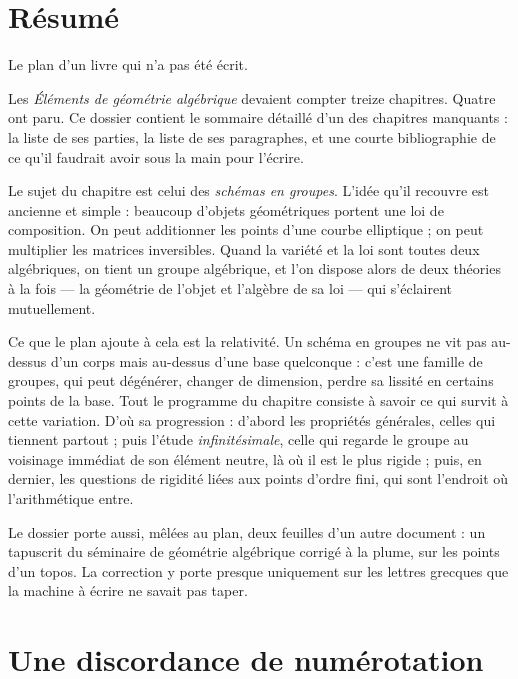 \documentclass[11pt,a4paper]{article}
\begin{document}
\section*{Résumé}

\begin{resume}
Le plan d'un livre qui n'a pas été écrit.

Les \emph{Éléments de géométrie algébrique} devaient compter treize chapitres.
Quatre ont paru. Ce dossier contient le sommaire détaillé d'un des chapitres
manquants : la liste de ses parties, la liste de ses paragraphes, et une courte
bibliographie de ce qu'il faudrait avoir sous la main pour l'écrire.

Le sujet du chapitre est celui des \emph{schémas en groupes}. L'idée qu'il
recouvre est ancienne et simple : beaucoup d'objets géométriques portent une
loi de composition. On peut additionner les points d'une courbe elliptique ;
on peut multiplier les matrices inversibles. Quand la variété et la loi sont
toutes deux algébriques, on tient un groupe algébrique, et l'on dispose alors de
deux théories à la fois --- la géométrie de l'objet et l'algèbre de sa loi ---
qui s'éclairent mutuellement.

Ce que le plan ajoute à cela est la relativité. Un schéma en groupes ne vit pas
au-dessus d'un corps mais au-dessus d'une base quelconque : c'est une famille de
groupes, qui peut dégénérer, changer de dimension, perdre sa lissité en
certains points de la base. Tout le programme du chapitre consiste à savoir ce
qui survit à cette variation. D'où sa progression : d'abord les propriétés
générales, celles qui tiennent partout ; puis l'étude \emph{infinitésimale},
celle qui regarde le groupe au voisinage immédiat de son élément neutre, là où
il est le plus rigide ; puis, en dernier, les questions de rigidité liées aux
points d'ordre fini, qui sont l'endroit où l'arithmétique entre.

Le dossier porte aussi, mêlées au plan, deux feuilles d'un autre document : un
tapuscrit du séminaire de géométrie algébrique corrigé à la plume, sur les
points d'un topos. La correction y porte presque uniquement sur les lettres
grecques que la machine à écrire ne savait pas taper.

\end{resume}

\section*{Une discordance de numérotation}
\end{document}
